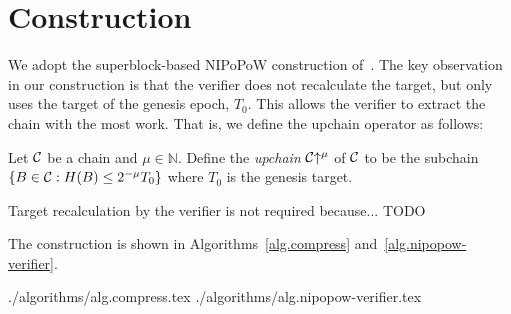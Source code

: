 \section{Construction}

We adopt the superblock-based NIPoPoW construction of~\cite{logspace}. The key
observation in our construction is that the verifier does not recalculate the
target, but only uses the target of the genesis epoch, $T_0$. This allows the
verifier to extract the chain with the most work. That is, we define the upchain operator as follows:

\begin{definition}[Upchain]
  Let $\mathcal{C}$ be a chain and $\mu \in \mathbb{N}$.
  Define the \emph{upchain} $\mathcal{C}\negthickspace\uparrow^\mu$ of $\mathcal{C}$ to be the
  subchain $\{B \in \mathcal{C}: H(B) \leq 2^{-\mu} T_0\}$ where
  $T_0$ is the genesis target.
\end{definition}

Target recalculation by the verifier is not required because... TODO

The construction is shown in Algorithms~\ref{alg.compress}
and~\ref{alg.nipopow-verifier}.

{./algorithms/alg.compress.tex}
{./algorithms/alg.nipopow-verifier.tex}
